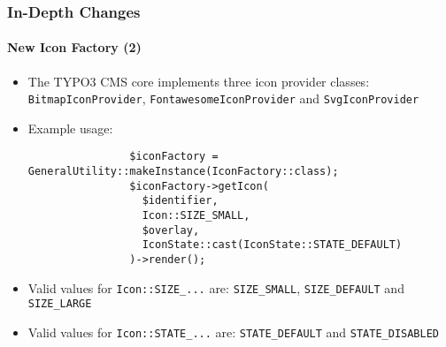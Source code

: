 \begin{frame}[fragile]
	\frametitle{In-Depth Changes}
	\framesubtitle{New Icon Factory (2)}

	\lstset{basicstyle=\tiny\ttfamily}

	\begin{itemize}

		\item The TYPO3 CMS core implements three icon provider classes:\newline
			\smaller
				\texttt{BitmapIconProvider}, \texttt{FontawesomeIconProvider} and \texttt{SvgIconProvider}
			\normalsize

		\item Example usage:

			\begin{lstlisting}
				$iconFactory = GeneralUtility::makeInstance(IconFactory::class);
				$iconFactory->getIcon(
				  $identifier,
				  Icon::SIZE_SMALL,
				  $overlay,
				  IconState::cast(IconState::STATE_DEFAULT)
				)->render();
			\end{lstlisting}

		\item Valid values for \texttt{Icon::SIZE\_...} are:\newline
			\small\texttt{SIZE\_SMALL}, \texttt{SIZE\_DEFAULT} and \texttt{SIZE\_LARGE}\normalsize
			\vspace{0.4cm}

		\item Valid values for \texttt{Icon::STATE\_...} are:\newline
			\small\texttt{STATE\_DEFAULT} and \texttt{STATE\_DISABLED}\normalsize

	\end{itemize}

\end{frame}



